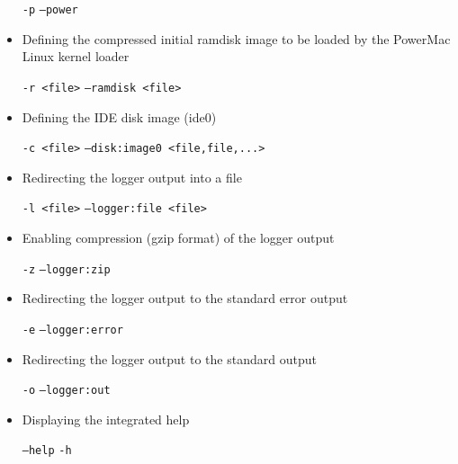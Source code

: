 \begin{itemize}
\texttt{-p}
\texttt{--power}

\item Defining the compressed initial ramdisk image to be loaded by the PowerMac Linux kernel loader

\texttt{-r <file>}
\texttt{--ramdisk <file>}

\item Defining the IDE disk image (ide0)

\texttt{-c <file>}
\texttt{--disk:image0 <file,file,...>}

\item Redirecting the logger output into a file

\texttt{-l <file>}
\texttt{--logger:file <file>}

\item Enabling compression (gzip format) of the logger output

\texttt{-z}
\texttt{--logger:zip}

\item Redirecting the logger output to the standard error output

\texttt{-e}
\texttt{--logger:error}

\item Redirecting the logger output to the standard output

\texttt{-o}
\texttt{--logger:out}

\item Displaying the integrated help

\texttt{--help}
\texttt{-h}

\end{itemize}